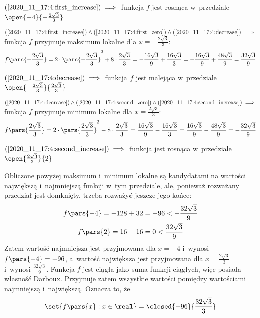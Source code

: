 \begin{description}
    \item \(\mbox{(\ref{2020_11_17:4:first_increase})} \implies\) funkcja \(f\) jest rosnąca w~przedziale \(\open{-4}{-\frac{2\sqrt{3}}{3}}\)
    \item \(\mbox{(\ref{2020_11_17:4:first_increase})} \land \mbox{(\ref{2020_11_17:4:first_zero})} \land \mbox{(\ref{2020_11_17:4:decrease})} \implies\) funkcja \(f\) przyjmuje maksimum lokalne dla \(x = -\frac{2\sqrt{3}}{3}\):
        \begin{equation*}
            f\pars{-\frac{2\sqrt{3}}{3}}
                = 2 \cdot \pars{-\frac{2\sqrt{3}}{3}}^3 + 8 \cdot \frac{2\sqrt{3}}{3}
                = -\frac{16\sqrt{3}}{9} + \frac{16\sqrt{3}}{3}
                = -\frac{16\sqrt{3}}{9} + \frac{48\sqrt{3}}{9}
                = \frac{32\sqrt{3}}{9}
        \end{equation*}
    \item \(\mbox{(\ref{2020_11_17:4:decrease})} \implies\) funkcja \(f\) jest malejąca w~przedziale \(\open{-\frac{2\sqrt{3}}{3}}{\frac{2\sqrt{3}}{3}}\)
    \item \(\mbox{(\ref{2020_11_17:4:decrease})} \land \mbox{(\ref{2020_11_17:4:second_zero})} \land \mbox{(\ref{2020_11_17:4:second_increase})} \implies\) funkcja \(f\) przyjmuje minimum lokalne dla \(x = \frac{2\sqrt{3}}{3}\):
        \begin{equation*}
            f\pars{\frac{2\sqrt{3}}{3}}
                = 2 \cdot \pars{\frac{2\sqrt{3}}{3}}^3 - 8 \cdot \frac{2\sqrt{3}}{3}
                = \frac{16\sqrt{3}}{9} - \frac{16\sqrt{3}}{3}
                = \frac{16\sqrt{3}}{9} - \frac{48\sqrt{3}}{9}
                = -\frac{32\sqrt{3}}{9}
        \end{equation*}
    \item \(\mbox{(\ref{2020_11_17:4:second_increase})} \implies\) funkcja jest rosnąca w~przedziale \(\open{\frac{2\sqrt{3}}{3}}{2}\)
\end{description}
Obliczone powyżej maksimum i~minimum lokalne są kandydatami na wartości największą i~najmniejszą funkcji w~tym przedziale, ale, ponieważ rozważany przedział jest domknięty, trzeba rozważyć jeszcze jego końce:
\begin{gather*}
    f\pars{-4}
        = -128 + 32
        = -96 < -\frac{32\sqrt{3}}{9}\\
    f\pars{2}
        = 16 - 16
        = 0 < \frac{32\sqrt{3}}{9}
\end{gather*}
Zatem wartość najmniejsza jest przyjmowana dla \(x = -4\) i~wynosi \(f\pars{-4} = -96\), a~wartość największa jest przyjmowana dla \(x = \frac{2\sqrt{3}}{3}\) i~wynosi \(\frac{32\sqrt{3}}{9}\). Funkcja \(f\) jest ciągła jako suma funkcji ciągłych, więc posiada własność Darboux. Przyjmuje zatem wszystkie wartości pomiędzy wartościami najmniejszą i~największą. Oznacza to, że
\begin{equation*}
    \set{f\pars{x} : x \in \real} = \closed{-96}{\frac{32\sqrt{3}}{3}}
\end{equation*}
